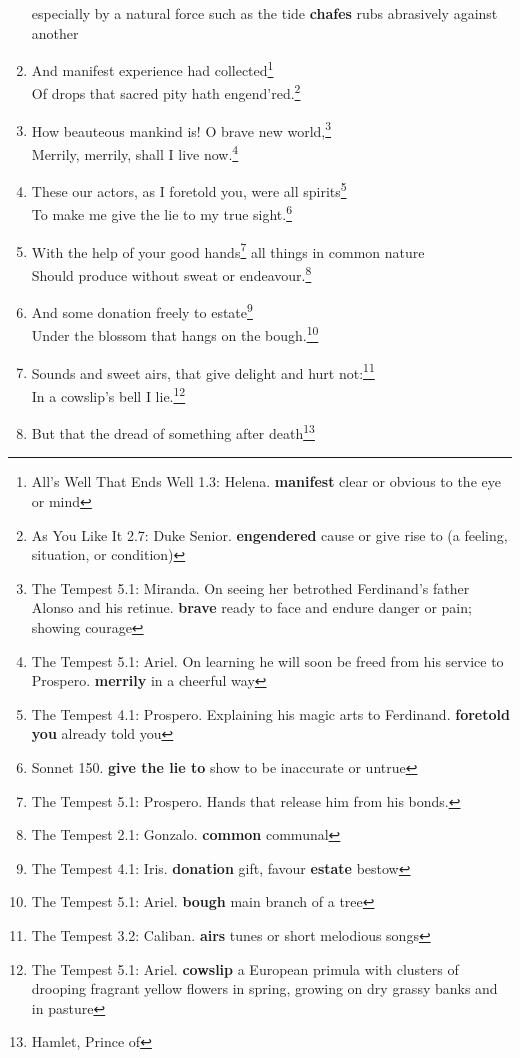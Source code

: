 \documentclass[17pt,twoside]{extarticle}
\begin{document}
\begin{enumerate}
{    especially by a natural force such as the tide \textbf{chafes} rubs
    abrasively against another}
\item
  And manifest experience had collected\footnote{All's Well That Ends
    Well 1.3: Helena. \textbf{manifest} clear or obvious to the eye or
    mind}\\Of drops that sacred pity hath engend'red.\footnote{As You
    Like It 2.7: Duke Senior. \textbf{engendered} cause or give rise to
    (a feeling, situation, or condition)}
\item
  How beauteous mankind is! O brave new world,\footnote{The Tempest 5.1:
    Miranda. On seeing her betrothed Ferdinand's father Alonso and his
    retinue. \textbf{brave} ready to face and endure danger or pain;
    showing courage}\\Merrily, merrily, shall I live now.\footnote{The
    Tempest 5.1: Ariel. On learning he will soon be freed from his
    service to Prospero. \textbf{merrily} in a cheerful way}
\item
  These our actors, as I foretold you, were all spirits\footnote{The
    Tempest 4.1: Prospero. Explaining his magic arts to Ferdinand.
    \textbf{foretold you} already told you}\\To make me give the lie to
  my true sight.\footnote{Sonnet 150. \textbf{give the lie to} show to
    be inaccurate or untrue}
\item
  With the help of your good hands\footnote{The Tempest 5.1: Prospero.
    Hands that release him from his bonds.} all things in common
  nature\\Should produce without sweat or endeavour.\footnote{The
    Tempest 2.1: Gonzalo. \textbf{common} communal}
\item
  And some donation freely to estate\footnote{The Tempest 4.1: Iris.
    \textbf{donation} gift, favour \textbf{estate} bestow}\\Under the
  blossom that hangs on the bough.\footnote{The Tempest 5.1: Ariel.
    \textbf{bough} main branch of a tree}
\item
  Sounds and sweet airs, that give delight and hurt not:\footnote{The
    Tempest 3.2: Caliban. \textbf{airs} tunes or short melodious songs}\\In
  a cowslip's bell I lie.\footnote{The Tempest 5.1: Ariel.
    \textbf{cowslip} a European primula with clusters of drooping
    fragrant yellow flowers in spring, growing on dry grassy banks and
    in pasture}
\item
  But that the dread of something after death\footnote{Hamlet, Prince of
}
\end{enumerate}
\end{document}
